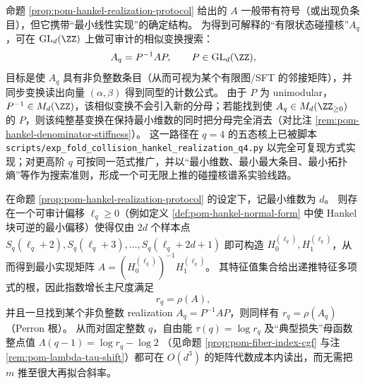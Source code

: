 \begin{remark}\label{rem:pom-nonneg-kernel-search-protocol}
命题 \ref{prop:pom-hankel-realization-protocol} 给出的 \(A\) 一般带有符号（或出现负条目），但它携带“最小线性实现”的确定结构。
为得到可解释的“有限状态碰撞核”\(A_q\)，可在 \(\mathrm{GL}_d(\ZZ)\) 上做可审计的相似变换搜索：
\[
A_q=P^{-1}AP,\qquad P\in\mathrm{GL}_d(\ZZ),
\]
目标是使 \(A_q\) 具有非负整数条目（从而可视为某个有限图/SFT 的邻接矩阵），并同步变换读出向量 \((\alpha,\beta)\) 得到同型的计数公式。
由于 \(P\) 为 unimodular，\(P^{-1}\in M_d(\ZZ)\)，该相似变换不会引入新的分母；若能找到使 \(A_q\in M_d(\ZZ_{\ge 0})\) 的 \(P\)，则该纯整基变换在保持最小维数的同时把分母完全消去（对比注 \ref{rem:pom-hankel-denominator-stiffness}）。
这一路径在 \(q=4\) 的五态核上已被脚本 \texttt{scripts/exp\_fold\_collision\_hankel\_realization\_q4.py} 以完全可复现方式实现；对更高阶 \(q\) 可按同一范式推广，并以“最小维数、最小最大条目、最小拓扑熵”等作为搜索准则，形成一个可无限上推的碰撞核谱系实验线路。
\end{remark}

\begin{corollary}\label{cor:pom-hankel-free-energy-evaluator}
在命题 \ref{prop:pom-hankel-realization-protocol} 的设定下，记最小维数为 \(d\)。
则存在一个可审计偏移 \(\ell_q\ge 0\)（例如定义 \ref{def:pom-hankel-normal-form} 中使 Hankel 块可逆的最小偏移）使得仅由 \(2d\) 个样本点
\(
S_q(\ell_q+2),S_q(\ell_q+3),\dots,S_q(\ell_q+2d+1)
\)
即可构造 \(H_0^{(\ell_q)},H_1^{(\ell_q)}\)，从而得到最小实现矩阵 \(A=(H_0^{(\ell_q)})^{-1}H_1^{(\ell_q)}\)。
其特征值集合给出递推特征多项式的根，因此指数增长主尺度满足
\[
r_q=\rho(A),
\]
并且一旦找到某个非负整数 realization \(A_q=P^{-1}AP\)，则同样有 \(r_q=\rho(A_q)\)（Perron 根）。
从而对固定整数 \(q\)，自由能 \(\tau(q)=\log r_q\) 及“典型损失”母函数整点值
\(
\Lambda(q-1)=\log r_q-\log2
\)
（见命题 \ref{prop:pom-fiber-index-cgf} 与注 \ref{rem:pom-lambda-tau-shift}）都可在 \(O(d^3)\) 的矩阵代数成本内读出，而无需把 \(m\) 推至很大再拟合斜率。
\end{corollary}

